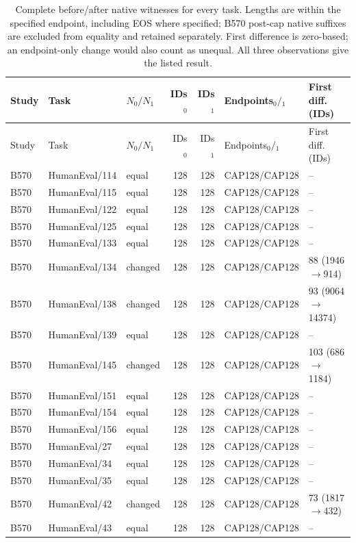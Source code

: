\begin{longtable}{@{}lllrrll@{}}
\caption{Complete before/after native witnesses for every task. Lengths are within the specified endpoint, including EOS where specified; B570 post-cap native suffixes are excluded from equality and retained separately. First difference is zero-based; an endpoint-only change would also count as unequal. All three observations give the listed result.}\\
\toprule Study & Task & $N_0/N_1$ & IDs$_0$ & IDs$_1$ & Endpoints$_0/{}_1$ & First diff. (IDs)\\\midrule\endfirsthead
\toprule Study & Task & $N_0/N_1$ & IDs$_0$ & IDs$_1$ & Endpoints$_0/{}_1$ & First diff. (IDs)\\\midrule\endhead
B570 & HumanEval/114 & equal & 128 & 128 & CAP128/CAP128 & -- \\
B570 & HumanEval/115 & equal & 128 & 128 & CAP128/CAP128 & -- \\
B570 & HumanEval/122 & equal & 128 & 128 & CAP128/CAP128 & -- \\
B570 & HumanEval/125 & equal & 128 & 128 & CAP128/CAP128 & -- \\
B570 & HumanEval/133 & equal & 128 & 128 & CAP128/CAP128 & -- \\
B570 & HumanEval/134 & changed & 128 & 128 & CAP128/CAP128 & 88 (1946$\to$914) \\
B570 & HumanEval/138 & changed & 128 & 128 & CAP128/CAP128 & 93 (9064$\to$14374) \\
B570 & HumanEval/139 & equal & 128 & 128 & CAP128/CAP128 & -- \\
B570 & HumanEval/145 & changed & 128 & 128 & CAP128/CAP128 & 103 (686$\to$1184) \\
B570 & HumanEval/151 & equal & 128 & 128 & CAP128/CAP128 & -- \\
B570 & HumanEval/154 & equal & 128 & 128 & CAP128/CAP128 & -- \\
B570 & HumanEval/156 & equal & 128 & 128 & CAP128/CAP128 & -- \\
B570 & HumanEval/27 & equal & 128 & 128 & CAP128/CAP128 & -- \\
B570 & HumanEval/34 & equal & 128 & 128 & CAP128/CAP128 & -- \\
B570 & HumanEval/35 & equal & 128 & 128 & CAP128/CAP128 & -- \\
B570 & HumanEval/42 & changed & 128 & 128 & CAP128/CAP128 & 73 (1817$\to$432) \\
B570 & HumanEval/43 & equal & 128 & 128 & CAP128/CAP128 & -- \\

\end{longtable}
